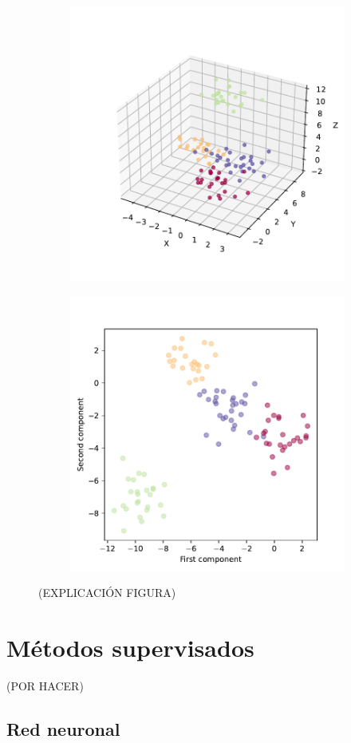 \begin{figure}[h]
  \centering
  \begin{subfigure}{0.45\textwidth}
    \centering
    \includegraphics[width=\textwidth]{figures/affinity-3d.pdf}
    \caption{}
    \label{fig:}
  \end{subfigure}
  \begin{subfigure}{0.45\textwidth}
    \centering
    \includegraphics[width=\textwidth]{figures/affinity-pca.pdf}
    \caption{}
    \label{fig:}
  \end{subfigure}
  \caption[Prueba del algoritmo de propagación de afinidad.]{(EXPLICACIÓN FIGURA)}
  \label{fig:}
\end{figure}

\newpage
\section{Métodos supervisados}
(POR HACER)

\cite[Deep Learning with PyTorch]{pytorch}
\subsection{Red neuronal}